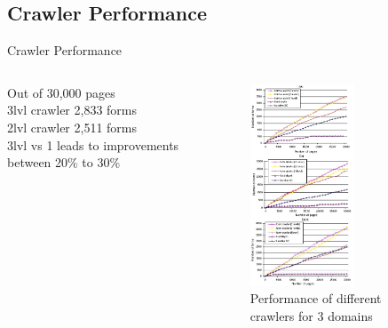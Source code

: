 \documentclass{beamer}
\begin{document}
\subsection{Crawler Performance}
\begin{frame}{Crawler Performance}
\begin{columns}[T,onlytextwidth]
	Out of 30,000 pages \\
3lvl crawler 2,833 forms \\
2lvl crawler  2,511 forms \\
3lvl vs 1 leads to improvements between 20\% to 30\% \\
  		\begin{figure}
			\includegraphics[height=6cm]{crawlerP.png}
			\caption{\footnotesize{Performance of different crawlers for 3 domains}}
\end{figure}
  \end{columns}


\end{frame}
\end{document}
